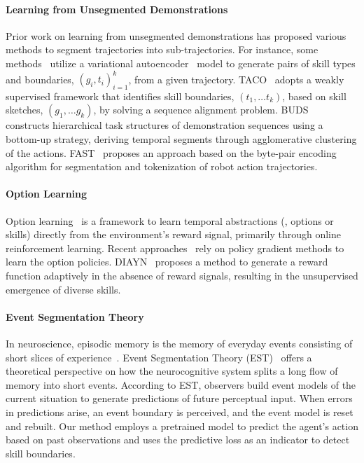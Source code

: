 \paragraph{Learning from Unsegmented Demonstrations} 
Prior work on learning from unsegmented demonstrations has proposed various methods to segment trajectories into sub-trajectories. For instance, some methods~\citep{temporal_vae, skid_raw, compile} utilize a variational autoencoder~\citep{vae} model to generate pairs of skill types and boundaries, $(g_i, t_i)_{i=1}^k$, from a given trajectory. TACO~\citep{taco} adopts a weakly supervised framework that identifies skill boundaries, $(t_1,\ldots t_k)$, based on skill sketches, $(g_1,\ldots g_k)$, by solving a sequence alignment problem. BUDS~\citep{buds} constructs hierarchical task structures of demonstration sequences using a bottom-up strategy, deriving temporal segments through agglomerative clustering of the actions. FAST~\citep{FAST} proposes an approach based on the byte-pair encoding~\citep{bpe} algorithm for segmentation and tokenization of robot action trajectories.

\paragraph{Option Learning}
Option learning~\citep{option} is a framework to learn temporal abstractions (\ie, options or skills) directly from the environment's reward signal, primarily through online reinforcement learning. Recent approaches~\citep{option-critic, option-discovery, flexible-option} rely on policy gradient methods to learn the option policies. DIAYN~\citep{DIAYN} proposes a method to generate a reward function adaptively in the absence of reward signals, resulting in the unsupervised emergence of diverse skills.

\paragraph{Event Segmentation Theory}
In neuroscience, episodic memory is the memory of everyday events consisting of short slices of experience~\citep{episodic_memory}. Event Segmentation Theory (EST)~\citep{EST} offers a theoretical perspective on how the neurocognitive system splits a long flow of memory into short events. According to EST, observers build event models of the current situation to generate predictions of future perceptual input. When errors in predictions arise, an event boundary is perceived, and the event model is reset and rebuilt. Our method employs a pretrained model to predict the agent's action based on past observations and uses the predictive loss as an indicator to detect skill boundaries.

